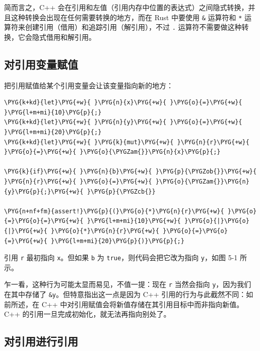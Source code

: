 简而言之，C++ 会在引用和左值（引用内存中位置的表达式）之间隐式转换，并且这种转换会出现在任何需要转换的地方，而在 Rust 中要使用 \texttt{\&} 运算符和 \texttt{*} 运算符来创建引用（借用）和追踪引用（解引用），不过 \texttt{.} 运算符不需要做这种转换，它会隐式借用和解引用。

\subsection{对引用变量赋值}

把引用赋值给某个引用变量会让该变量指向新的地方：

\begin{Verbatim}[commandchars=\\\{\},breaklines=true,breakanywhere=true,fontsize=\codefont,xleftmargin=17bp]
\PYG{k+kd}{let}\PYG{+w}{ }\PYG{n}{x}\PYG{+w}{ }\PYG{o}{=}\PYG{+w}{ }\PYG{l+m+mi}{10}\PYG{p}{;}
\PYG{k+kd}{let}\PYG{+w}{ }\PYG{n}{y}\PYG{+w}{ }\PYG{o}{=}\PYG{+w}{ }\PYG{l+m+mi}{20}\PYG{p}{;}
\PYG{k+kd}{let}\PYG{+w}{ }\PYG{k}{mut}\PYG{+w}{ }\PYG{n}{r}\PYG{+w}{ }\PYG{o}{=}\PYG{+w}{ }\PYG{o}{\PYGZam{}}\PYG{n}{x}\PYG{p}{;}

\PYG{k}{if}\PYG{+w}{ }\PYG{n}{b}\PYG{+w}{ }\PYG{p}{\PYGZob{}}\PYG{+w}{ }\PYG{n}{r}\PYG{+w}{ }\PYG{o}{=}\PYG{+w}{ }\PYG{o}{\PYGZam{}}\PYG{n}{y}\PYG{p}{;}\PYG{+w}{ }\PYG{p}{\PYGZcb{}}

\PYG{n+nf+fm}{assert!}\PYG{p}{(}\PYG{o}{*}\PYG{n}{r}\PYG{+w}{ }\PYG{o}{=}\PYG{o}{=}\PYG{+w}{ }\PYG{l+m+mi}{10}\PYG{+w}{ }\PYG{o}{|}\PYG{o}{|}\PYG{+w}{ }\PYG{o}{*}\PYG{n}{r}\PYG{+w}{ }\PYG{o}{=}\PYG{o}{=}\PYG{+w}{ }\PYG{l+m+mi}{20}\PYG{p}{)}\PYG{p}{;}
\end{Verbatim}

引用 \texttt{r} 最初指向 \texttt{x}。但如果 \texttt{b} 为 \texttt{true}，则代码会把它改为指向 \texttt{y}，如图 5-1 所示。


乍一看，这种行为可能太显而易见，不值一提：现在 \texttt{r} 当然会指向 \texttt{y}，因为我们在其中存储了 \texttt{\&y}。但特意指出这一点是因为 C++ 引用的行为与此截然不同：如前所述，在 C++ 中对引用赋值会将新值存储在其引用目标中而非指向新值。C++ 的引用一旦完成初始化，就无法再指向别处了。

\subsection{对引用进行引用}

